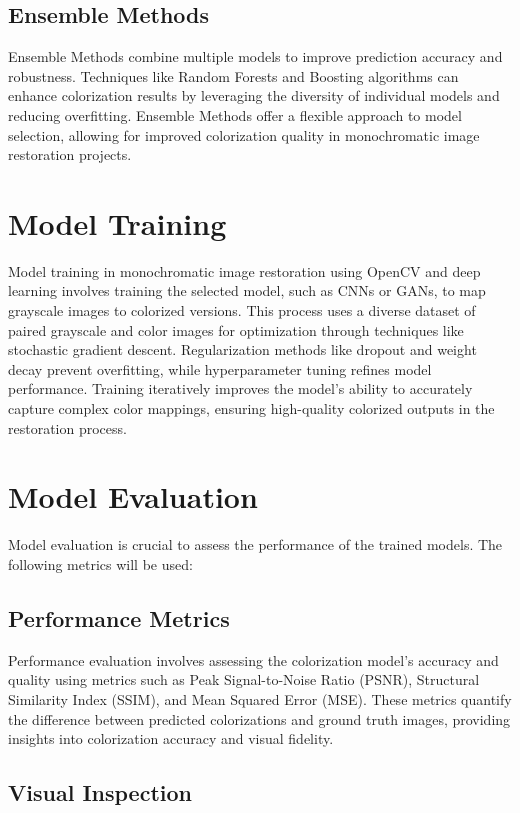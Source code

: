 \subsection{Ensemble Methods}

Ensemble Methods combine multiple models to improve prediction accuracy and robustness. Techniques like Random Forests and Boosting algorithms can enhance colorization results by leveraging the diversity of individual models and reducing overfitting. Ensemble Methods offer a flexible approach to model selection, allowing for improved colorization quality in monochromatic image restoration projects.

\section{Model Training}

Model training in monochromatic image restoration using OpenCV and deep learning involves training the selected model, such as CNNs or GANs, to map grayscale images to colorized versions. This process uses a diverse dataset of paired grayscale and color images for optimization through techniques like stochastic gradient descent. Regularization methods like dropout and weight decay prevent overfitting, while hyperparameter tuning refines model performance. Training iteratively improves the model's ability to accurately capture complex color mappings, ensuring high-quality colorized outputs in the restoration process.

\section{Model Evaluation}

Model evaluation is crucial to assess the performance of the trained models. The following metrics will be used:

\subsection{Performance Metrics}

Performance evaluation involves assessing the colorization model's accuracy and quality using metrics such as Peak Signal-to-Noise Ratio (PSNR), Structural Similarity Index (SSIM), and Mean Squared Error (MSE). These metrics quantify the difference between predicted colorizations and ground truth images, providing insights into colorization accuracy and visual fidelity.

\subsection{Visual Inspection}

